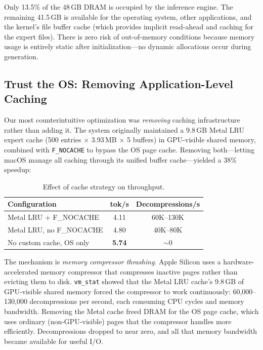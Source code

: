 \documentclass[11pt,twocolumn]{article}
\begin{document}
Only 13.5\% of the 48\,GB DRAM is occupied by the inference engine.
The remaining 41.5\,GB is available for the operating system, other applications, and the kernel's file buffer cache (which provides implicit read-ahead and caching for the expert files).
There is zero risk of out-of-memory conditions because memory usage is entirely static after initialization---no dynamic allocations occur during generation.

\subsection{Trust the OS: Removing Application-Level Caching}
\label{sec:trust_os}

Our most counterintuitive optimization was \emph{removing} caching infrastructure rather than adding it.
The system originally maintained a 9.8\,GB Metal LRU expert cache (500 entries $\times$ 3.93\,MB $\times$ 5 buffers) in GPU-visible shared memory, combined with \texttt{F\_NOCACHE} to bypass the OS page cache.
Removing both---letting macOS manage all caching through its unified buffer cache---yielded a 38\% speedup:

\begin{table}[t]
\centering
\small
\caption{Effect of cache strategy on throughput.}
\label{tab:trust_os}
\begin{tabular}{@{}lcc@{}}
\toprule
\textbf{Configuration} & \textbf{tok/s} & \textbf{Decompressions/s} \\
\midrule
Metal LRU + F\_NOCACHE & 4.11 & 60K--130K \\
Metal LRU, no F\_NOCACHE & 4.80 & 40K--80K \\
No custom cache, OS only & \textbf{5.74} & $\sim$0 \\
\bottomrule
\end{tabular}
\end{table}

The mechanism is \emph{memory compressor thrashing}.
Apple Silicon uses a hardware-accelerated memory compressor that compresses inactive pages rather than evicting them to disk.
\texttt{vm\_stat} showed that the Metal LRU cache's 9.8\,GB of GPU-visible shared memory forced the compressor to work continuously: 60,000--130,000 decompressions per second, each consuming CPU cycles and memory bandwidth.
Removing the Metal cache freed DRAM for the OS page cache, which uses ordinary (non-GPU-visible) pages that the compressor handles more efficiently.
Decompressions dropped to near zero, and all that memory bandwidth became available for useful I/O.
\end{document}
